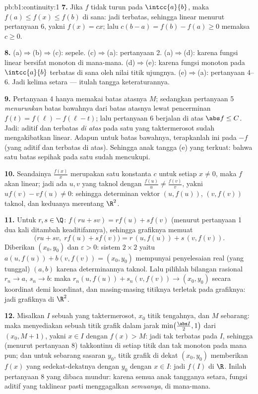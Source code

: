 \begin{solution}{pb:b1:continuity:1}
\textbf{7.} Jika $f$ tidak turun pada $\intcc{a}{b}$, maka
$f(a) \leq f(x) \leq f(b)$ di sana: jadi terbatas, sehingga linear menurut pertanyaan
6, yakni $f(x) = cx$; lalu $c(b - a) = f(b) - f(a) \geq 0$ memaksa $c
\geq 0$.

\textbf{8.} (a)$\Rightarrow$(b)$\Rightarrow$(c): sepele.
(c)$\Rightarrow$(a): pertanyaan 2. (a)$\Rightarrow$(d): karena fungsi
linear bersifat monoton di mana-mana. (d)$\Rightarrow$(e): karena fungsi monoton
pada $\intcc{a}{b}$ terbatas di sana oleh nilai titik
ujungnya. (e)$\Rightarrow$(a): pertanyaan 4--6. Jadi kelima
 setara --- itulah tangga keteraturannya.

\textbf{9.} Pertanyaan 4 hanya memakai batas atasnya $M$; sedangkan pertanyaan 5
\emph{menurunkan} batas bawahnya dari batas atasnya lewat
pencerminan $f(t) = f(\ell) - f(\ell - t)$; lalu pertanyaan 6 berjalan di atas
$\abs f \leq C$. Jadi: aditif dan terbatas \emph{di atas} pada satu
 yang taktermerosot sudah mengakibatkan linear. Adapun untuk batas
bawahnya, terapkanlah ini pada $-f$ (yang aditif dan terbatas di atas). Sehingga anak tangga
(e) yang terkuat: bahwa satu batas sepihak pada satu  sudah mencukupi.

\textbf{10.} Seandainya $\frac{f(x)}{x}$ merupakan satu konstanta $c$ untuk setiap
$x \neq 0$, maka $f$ akan linear; jadi ada $u, v$ yang taknol
dengan $\frac{f(u)}u \neq \frac{f(v)}v$, yakni $u f(v) - v f(u)
\neq 0$: sehingga determinan vektor $(u, f(u))$, $(v,
f(v))$ taknol, dan keduanya merentang $\R^2$.

\textbf{11.} Untuk $r, s \in \Q$: $f(ru + sv) = r f(u) + s f(v)$
(menurut pertanyaan 1 dua kali ditambah keaditifannya), sehingga grafiknya memuat
\[
\bigl(ru + sv,\; r f(u) + s f(v)\bigr)
= r\,(u, f(u)) + s\,(v, f(v)) .
\]
Diberikan $(x_0, y_0)$ dan $\varepsilon > 0$: sistem $2 \times 2$
yaitu $a(u, f(u)) + b(v, f(v)) = (x_0, y_0)$ mempunyai penyelesaian real
(yang tunggal) $(a, b)$ karena determinannya taknol. Lalu pilihlah
bilangan rasional $r_n \to a$, $s_n \to b$: maka $r_n(u, f(u)) +
s_n(v, f(v)) \to (x_0, y_0)$ secara koordinat demi koordinat, dan masing-masing
titiknya terletak pada grafiknya: jadi grafiknya  di $\R^2$.

\textbf{12.} Misalkan $I$ sebuah  yang taktermerosot, $x_0$ titik
tengahnya, dan $M$ sebarang: maka  menyediakan sebuah titik grafik dalam jarak
$\min\bigl(\frac{\abs I}{2}, 1\bigr)$ dari $(x_0, M + 1)$, yakni
$x \in I$ dengan $f(x) > M$: jadi tak terbatas pada $I$, sehingga (menurut pertanyaan 8)
takkontinu di setiap titik dan tak monoton pada  mana pun; dan
untuk sebarang sasaran $y_0$, titik grafik di dekat $(x_0, y_0)$ memberikan $f(x)$
yang sedekat-dekatnya dengan $y_0$ dengan $x \in I$: jadi $f(I)$  di
$\R$. Inilah pertanyaan 8 yang dibaca mundur: karena semua anak tangganya
setara, fungsi aditif yang taklinear pasti menggagalkan \emph{semuanya},
di mana-mana.


\end{solution}
